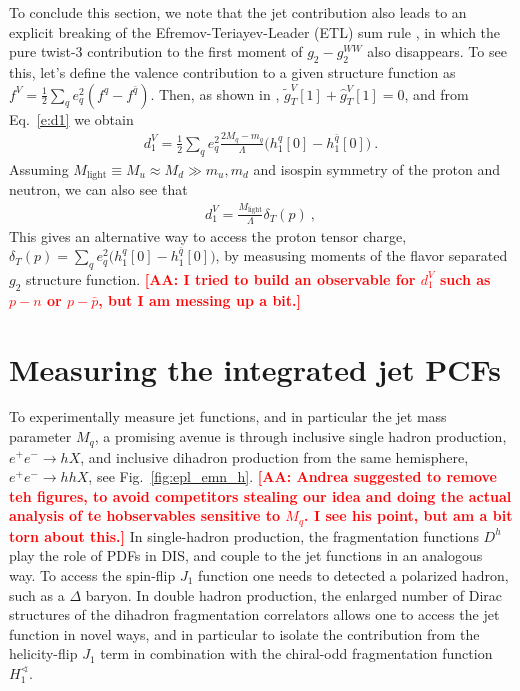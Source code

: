 \documentclass[preprintnumbers,floatfix,nofootinbib]{revtex4}
\def\AAcom#1{{\bf  \textcolor{Red}{[AA: {#1}]}}}
\newcommand{\mj}{M_q}
\newcommand{\mq}{m_q}
\begin{document}
To conclude this section, we note that the jet contribution also leads to an explicit breaking of the Efremov-Teriayev-Leader (ETL) sum rule \cite{Efremov:1996hd}, in which the pure twist-3 contribution to the first moment of $g_2-g_2^{WW}$ also disappears. To see this, let's define the valence contribution to a given structure function as $f^V=\frac12\sum_q e_q^2 (f^q-f^{\bar q})$. Then, as shown in \cite{Efremov:1996hd}, $\tilde g_T^V[1]+\widehat g_T^V[1] = 0$, and from Eq.~\eqref{e:d1} we obtain
\begin{align}
  d_1^V = \frac12 \sum_q e_q^2 \frac{2\mj- \mq}{\Lambda} 
    \big(h_1^{q}[0]-h_1^{\bar q}[0]\big) \ .
\end{align}
Assuming $M_\text{light}\equiv M_u \approx M_d \gg m_u , m_d$ and isospin symmetry of the proton and neutron, we can also see that 
\begin{align}
  d_1^V = \frac{M_{\text{light}}}{\Lambda} \delta_T(p) \ ,   
\end{align}
This gives an alternative way to access the proton tensor charge, $\delta_T(p) = \sum_q e_q^2 \big(h_1^{q}[0]-h_1^{\bar q}[0]\big)$, by measusing moments of the flavor separated $g_2$ structure function.
\AAcom{I tried to build an observable for $d_1^V$ such as $p-n$ or $p-\bar p$, but I am messing up a bit.}


\section{Measuring the integrated jet PCFs}


To experimentally measure jet functions, and in particular the jet mass parameter $M_q$, a promising avenue is through inclusive single hadron production, $e^+ e^- \to h X$, and inclusive dihadron 
production from the same hemisphere, $e^+ e^- \to h h X$, see 
Fig.~\ref{fig:epl_emn_h}.
\AAcom{Andrea suggested to remove teh figures, to avoid competitors stealing our idea and doing the actual analysis of te hobservables sensitive to $M_q$. I see his point, but am a bit torn about this.}
In single-hadron production, the fragmentation functions $D^h$
play the role of PDFs in DIS, and couple to the jet functions
in an analogous way. To access the spin-flip $J_1$ function one needs to detected a polarized hadron, such as a $\Delta$ baryon. 
In double hadron production, the enlarged number of Dirac structures
of the dihadron fragmentation correlators \cite{Bacchetta:2002ux,Bacchetta:2003vn} allows one to access
the jet function in novel ways, and in particular to isolate the
contribution from the helicity-flip $J_1$ term in combination with the
chiral-odd fragmentation function $H_1^{\sphericalangle}$. 
\end{document}
